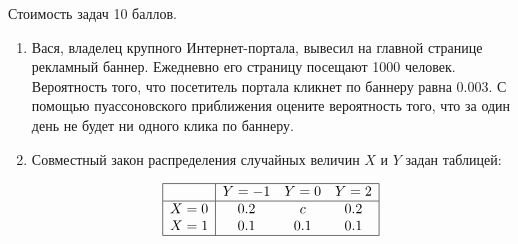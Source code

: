 \documentclass[12pt, a4paper]{article}\usepackage[]{graphicx}\usepackage[]{color}
\begin{document}
Стоимость задач 10 баллов.
\begin{enumerate}
\item Вася, владелец крупного Интернет-портала, вывесил на главной странице рекламный баннер. Ежедневно его страницу посещают 1000 человек. Вероятность того, что посетитель портала кликнет по баннеру равна 0.003. С помощью пуассоновского приближения оцените вероятность того, что за один день не будет ни одного клика по баннеру.
\item Совместный закон распределения случайных величин  $X$  и  $Y$  задан таблицей:

\[
\begin{array}{|c|ccc|}  \hline {} & {Y=-1} & {Y=0} & {Y=2} \\  \hline {X=0} & {0.2} & {c} & {0.2} \\ {X=1} & {0.1} & {0.1} & {0.1} \\  \hline  \end{array}
\]


\end{enumerate}
\end{document}
